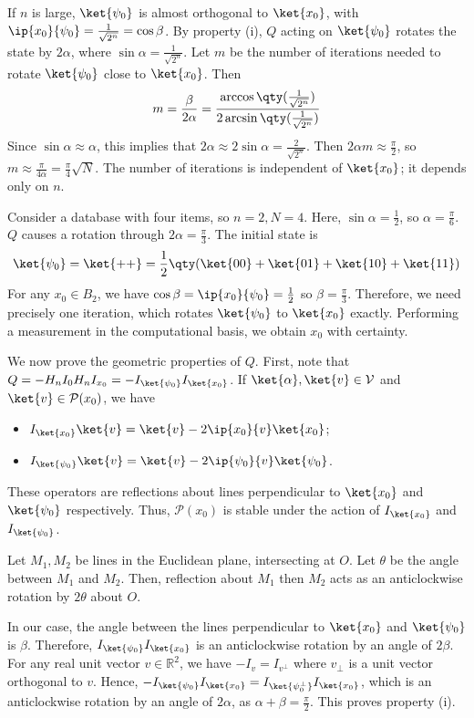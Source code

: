If $n$ is large, $\ket{\psi_0}$ is almost orthogonal to $\ket{x_0}$, with $\ip{x_0}{\psi_0} = \frac{1}{\sqrt{2^n}} = \cos \beta$.
By property (i), $Q$ acting on $\ket{\psi_0}$ rotates the state by $2\alpha$, where $\sin\alpha = \frac{1}{\sqrt{2^n}}$.
Let $m$ be the number of iterations needed to rotate $\ket{\psi_0}$ close to $\ket{x_0}$.
Then
\[ m = \frac{\beta}{2\alpha} = \frac{\arccos\qty(\frac{1}{\sqrt{2^n}})}{2\arcsin\qty(\frac{1}{\sqrt{2^n}})} \]
Since $\sin \alpha \approx \alpha$, this implies that $2\alpha \approx 2\sin\alpha = \frac{2}{\sqrt{2^n}}$.
Then $2 \alpha m \approx \frac{\pi}{2}$, so $m \approx \frac{\pi}{4\alpha} = \frac{\pi}{4} \sqrt{N}$.
The number of iterations is independent of $\ket{x_0}$; it depends only on $n$.
\begin{example}
    Consider a database with four items, so $n = 2, N = 4$.
    Here, $\sin \alpha = \frac{1}{2}$, so $\alpha = \frac{\pi}{6}$.
    $Q$ causes a rotation through $2\alpha = \frac{\pi}{3}$.
    The initial state is
    \[ \ket{\psi_0} = \ket{++} = \frac{1}{2}\qty(\ket{00} + \ket{01} + \ket{10} + \ket{11}) \]
    For any $x_0 \in B_2$, we have $\cos\beta = \ip{x_0}{\psi_0} = \frac{1}{2}$ so $\beta = \frac{\pi}{3}$.
    Therefore, we need precisely one iteration, which rotates $\ket{\psi_0}$ to $\ket{x_0}$ exactly.
    Performing a measurement in the computational basis, we obtain $x_0$ with certainty.
\end{example}
We now prove the geometric properties of $Q$.
First, note that $Q = -H_n I_0 H_n I_{x_0} = -I_{\ket{\psi_0}} I_{\ket{x_0}}$.
If $\ket{\alpha}, \ket{v} \in \mathcal V$ and $\ket{v} \in \mathcal P(x_0)$, we have
\begin{itemize}
    \item $I_{\ket{x_0}} \ket{v} = \ket{v} - 2\ip{x_0}{v} \ket{x_0}$;
    \item $I_{\ket{\psi_0}} \ket{v} = \ket{v} - 2\ip{\psi_0}{v} \ket{\psi_0}$.
\end{itemize}
These operators are reflections about lines perpendicular to $\ket{x_0}$ and $\ket{\psi_0}$ respectively.
Thus, $\mathcal P(x_0)$ is stable under the action of $I_{\ket{x_0}}$ and $I_{\ket{\psi_0}}$.

Let $M_1, M_2$ be lines in the Euclidean plane, intersecting at $O$.
Let $\theta$ be the angle between $M_1$ and $M_2$.
Then, reflection about $M_1$ then $M_2$ acts as an anticlockwise rotation by $2\theta$ about $O$.

In our case, the angle between the lines perpendicular to $\ket{x_0}$ and $\ket{\psi_0}$ is $\beta$.
Therefore, $I_{\ket{\psi_0}} I_{\ket{x_0}}$ is an anticlockwise rotation by an angle of $2\beta$.
For any real unit vector $v \in \mathbb R^2$, we have $-I_v = I_{v^\perp}$ where $v_\perp$ is a unit vector orthogonal to $v$.
Hence, $-I_{\ket{\psi_0}} I_{\ket{x_0}} = I_{\ket{\psi_0^\perp}} I_{\ket{x_0}}$, which is an anticlockwise rotation by an angle of $2\alpha$, as $\alpha + \beta = \frac{\pi}{2}$.
This proves property (i).

